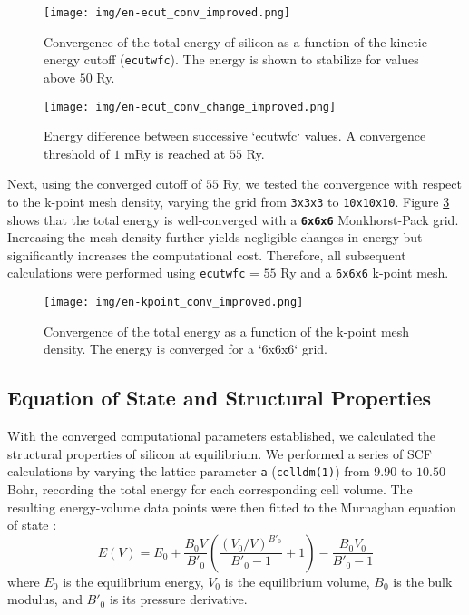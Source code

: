 \documentclass{article}
\begin{document}
\begin{figure}[h!]
    \centering
    \texttt{[image: img/en-ecut\_conv\_improved.png]}
    \caption{Convergence of the total energy of silicon as a function of the kinetic energy cutoff (\verb|ecutwfc|). The energy is shown to stabilize for values above $50$ Ry.}
    \label{fig:en-ecut}
\end{figure}

\begin{figure}[h!]
    \centering
    \texttt{[image: img/en-ecut\_conv\_change\_improved.png]}
    \caption{Energy difference between successive `ecutwfc` values. A convergence threshold of $1$ mRy is reached at $55$ Ry.}
    \label{fig:en-ecut_diff}
\end{figure}

Next, using the converged cutoff of $55$ Ry, we tested the convergence with respect to the k-point mesh density, varying the grid from \verb|3x3x3| to \verb|10x10x10|. Figure \ref{fig:en-kpoint} shows that the total energy is well-converged with a \textbf{\verb|6x6x6|} Monkhorst-Pack grid. Increasing the mesh density further yields negligible changes in energy but significantly increases the computational cost. Therefore, all subsequent calculations were performed using \verb|ecutwfc| = $55$ Ry and a \verb|6x6x6| k-point mesh.

\begin{figure}[h!]
    \centering
    \texttt{[image: img/en-kpoint\_conv\_improved.png]}
    \caption{Convergence of the total energy as a function of the k-point mesh density. The energy is converged for a `6x6x6` grid.}
    \label{fig:en-kpoint}
\end{figure}

\subsection{Equation of State and Structural Properties}

With the converged computational parameters established, we calculated the structural properties of silicon at equilibrium. We performed a series of SCF calculations by varying the lattice parameter \verb|a| (\verb|celldm(1)|) from $9.90$ to $10.50$ Bohr, recording the total energy for each corresponding cell volume. The resulting energy-volume data points were then fitted to the Murnaghan equation of state \cite{murnaghan1944}:
$$ E(V) = E_0 + \frac{B_0 V}{B'_0} \left( \frac{(V_0/V)^{B'_0}}{B'_0 - 1} + 1 \right) - \frac{B_0 V_0}{B'_0 - 1} $$
where $E_0$ is the equilibrium energy, $V_0$ is the equilibrium volume, $B_0$ is the bulk modulus, and $B'_0$ is its pressure derivative.
\end{document}

